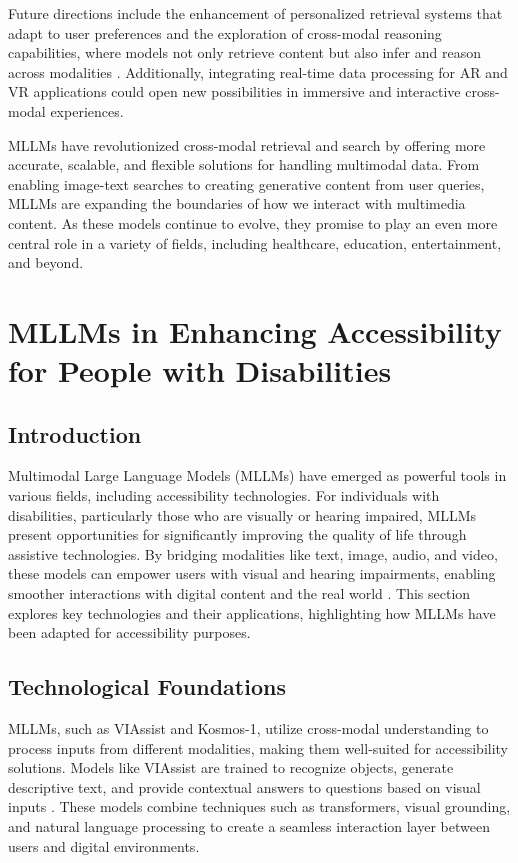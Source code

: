 \documentclass{article}
\begin{document}
Future directions include the enhancement of personalized retrieval systems that adapt to user preferences and the exploration of cross-modal reasoning capabilities, where models not only retrieve content but also infer and reason across modalities \cite{vs2024yin,vs2024palmagomez}. Additionally, integrating real-time data processing for AR and VR applications could open new possibilities in immersive and interactive cross-modal experiences.

MLLMs have revolutionized cross-modal retrieval and search by offering more accurate, scalable, and flexible solutions for handling multimodal data. From enabling image-text searches to creating generative content from user queries, MLLMs are expanding the boundaries of how we interact with multimedia content. As these models continue to evolve, they promise to play an even more central role in a variety of fields, including healthcare, education, entertainment, and beyond.

\section{MLLMs in Enhancing Accessibility for People with Disabilities}

\subsection{Introduction}
Multimodal Large Language Models (MLLMs) have emerged as powerful tools in various fields, including accessibility technologies. For individuals with disabilities, particularly those who are visually or hearing impaired, MLLMs present opportunities for significantly improving the quality of life through assistive technologies. By bridging modalities like text, image, audio, and video, these models can empower users with visual and hearing impairments, enabling smoother interactions with digital content and the real world \cite{vs2024yang,vs2024huang}. This section explores key technologies and their applications, highlighting how MLLMs have been adapted for accessibility purposes.

\subsection{Technological Foundations}
MLLMs, such as VIAssist and Kosmos-1, utilize cross-modal understanding to process inputs from different modalities, making them well-suited for accessibility solutions. Models like VIAssist are trained to recognize objects, generate descriptive text, and provide contextual answers to questions based on visual inputs \cite{vs2024yang}. These models combine techniques such as transformers, visual grounding, and natural language processing to create a seamless interaction layer between users and digital environments.
\end{document}
